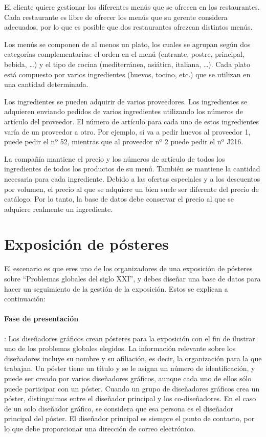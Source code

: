 \documentclass[a4paper]{article}
\begin{document}
El cliente quiere gestionar los diferentes menús que se ofrecen en los restaurantes. Cada restaurante es libre de ofrecer los menús que su gerente considera adecuados, por lo que es posible que dos restaurantes ofrezcan distintos menús.

Los menús se componen de al menos un plato, los cuales se agrupan según dos categorías complementarias: el orden en el menú (entrante, postre, principal, bebida, \ldots) y el tipo de cocina (mediterránea, asiática, italiana, \ldots). Cada plato está compuesto por varios ingredientes (huevos, tocino, etc.) que se utilizan en una cantidad determinada.

Los ingredientes se pueden adquirir de varios proveedores. Los ingredientes se adquieren enviando pedidos de varios ingredientes utilizando los números de artículo del proveedor. El número de artículo para cada uno de estos ingredientes varía de un proveedor a otro. Por ejemplo, si va a pedir huevos al proveedor 1, puede pedir el nº 52, mientras que al proveedor nº 2 puede pedir el nº J216. 

La compañía mantiene el precio y los números de artículo de todos los ingredientes de todos los productos de su menú. También se mantiene la cantidad necesaria para cada ingrediente. Debido a las ofertas especiales y a los descuentos por volumen, el precio al que se adquiere un bien suele ser diferente del precio de catálogo. Por lo tanto, la base de datos debe conservar el precio al que se adquiere realmente un ingrediente.

\section{Exposición de pósteres}
El escenario es que eres uno de los organizadores de una exposición de pósteres sobre ``Problemas globales del siglo XXI'', y debes diseñar una base de datos para hacer un seguimiento de la gestión de la exposición.  Estos se explican a continuación:

\paragraph{Fase de presentación}: Los diseñadores gráficos crean pósteres para la exposición con el fin de ilustrar uno de los problemas globales elegidos.  La información relevante sobre los diseñadores incluye su nombre y su afiliación, es decir, la organización para la que trabajan.  Un póster tiene un título y se le asigna un número de identificación, y puede ser creado por varios diseñadores gráficos, aunque cada uno de ellos sólo puede participar con un póster.  Cuando un grupo de diseñadores gráficos crea un póster, distinguimos entre el diseñador principal y los co-diseñadores.  En el caso de un solo diseñador gráfico, se considera que esa persona es el diseñador principal del póster.  El diseñador principal es siempre el punto de contacto, por lo que debe proporcionar una dirección de correo electrónico.
\end{document}
